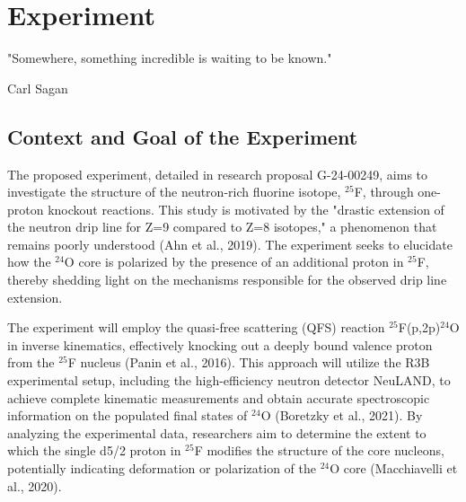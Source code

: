 
%

\makeatletter
\newcommand{\ntifpkgloaded}{%
  \@ifpackageloaded%
}
\makeatother


\chapter{Experiment}
\label{cha:experiment}

\epigraph{
	"Somewhere, something incredible is waiting to be known."
}{Carl Sagan}



\section{Context and Goal of the Experiment} %
\label{sec:contex_goal_experiment}

The proposed experiment, detailed in research proposal G-24-00249, aims to investigate the structure of the neutron-rich fluorine isotope, $^{25}$F, through one-proton knockout reactions. This study is motivated by the "drastic extension of the neutron drip line for Z=9 compared to Z=8 isotopes," a phenomenon that remains poorly understood (Ahn et al., 2019). The experiment seeks to elucidate how the $^{24}$O core is polarized by the presence of an additional proton in $^{25}$F, thereby shedding light on the mechanisms responsible for the observed drip line extension.

The experiment will employ the quasi-free scattering (QFS) reaction $^{25}$F(p,2p)$^{24}$O in inverse kinematics, effectively knocking out a deeply bound valence proton from the $^{25}$F nucleus (Panin et al., 2016). This approach will utilize the R3B experimental setup, including the high-efficiency neutron detector NeuLAND, to achieve complete kinematic measurements and obtain accurate spectroscopic information on the populated final states of $^{24}$O (Boretzky et al., 2021). By analyzing the experimental data, researchers aim to determine the extent to which the single d5/2 proton in $^{25}$F modifies the structure of the core nucleons, potentially indicating deformation or polarization of the $^{24}$O core (Macchiavelli et al., 2020).

